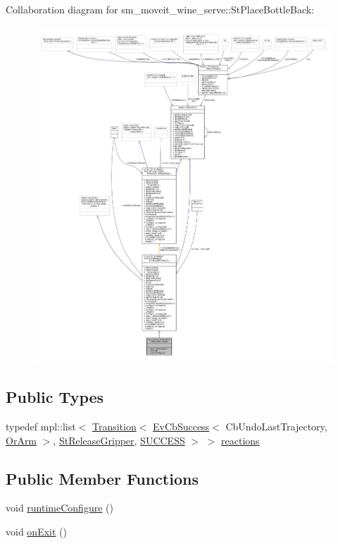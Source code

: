 Collaboration diagram for sm\+\_\+moveit\+\_\+wine\+\_\+serve\+:\+:St\+Place\+Bottle\+Back\+:
\nopagebreak
\begin{figure}[H]
\begin{center}
\leavevmode
\includegraphics[width=350pt]{structsm__moveit__wine__serve_1_1StPlaceBottleBack__coll__graph}
\end{center}
\end{figure}
\subsection*{Public Types}
\begin{DoxyCompactItemize}
\item 
typedef mpl\+::list$<$ \hyperlink{classsmacc_1_1Transition}{Transition}$<$ \hyperlink{structsmacc_1_1EvCbSuccess}{Ev\+Cb\+Success}$<$ Cb\+Undo\+Last\+Trajectory, \hyperlink{classsm__moveit__wine__serve_1_1OrArm}{Or\+Arm} $>$, \hyperlink{structsm__moveit__wine__serve_1_1StReleaseGripper}{St\+Release\+Gripper}, \hyperlink{structsmacc_1_1default__transition__tags_1_1SUCCESS}{S\+U\+C\+C\+E\+SS} $>$ $>$ \hyperlink{structsm__moveit__wine__serve_1_1StPlaceBottleBack_a8d88f53703fd785a14c970cdc89f4564}{reactions}
\end{DoxyCompactItemize}
\subsection*{Public Member Functions}
\begin{DoxyCompactItemize}
\item 
void \hyperlink{structsm__moveit__wine__serve_1_1StPlaceBottleBack_ac7ccf6e5d364bf1f6c3e33102575c6eb}{runtime\+Configure} ()
\item 
void \hyperlink{structsm__moveit__wine__serve_1_1StPlaceBottleBack_a2882d1aa09d608b27787bb6f66fe7b23}{on\+Exit} ()
\end{DoxyCompactItemize}
